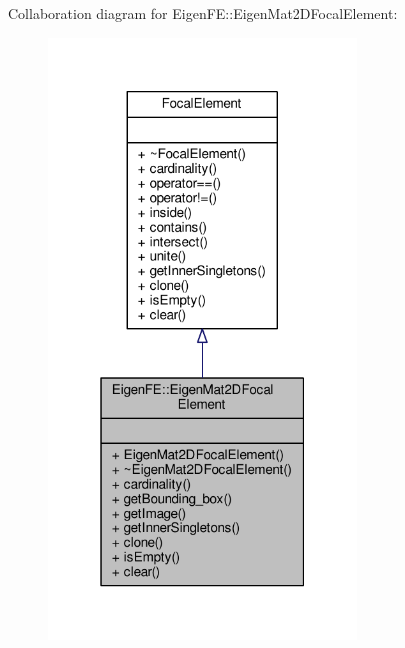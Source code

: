 Collaboration diagram for Eigen\+F\+E\+:\+:Eigen\+Mat2\+D\+Focal\+Element\+:\nopagebreak
\begin{figure}[H]
\begin{center}
\leavevmode
\includegraphics[width=232pt]{classEigenFE_1_1EigenMat2DFocalElement__coll__graph}
\end{center}
\end{figure}
